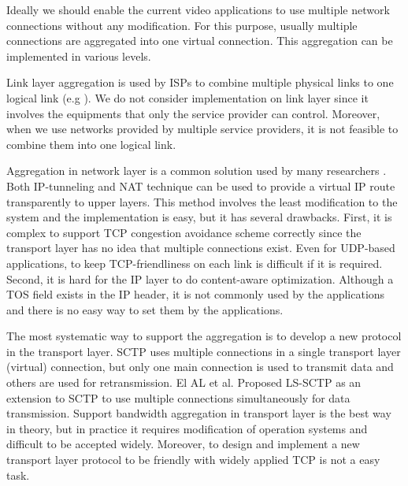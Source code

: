 \documentclass{article}
\begin{document}
	Ideally we should enable the current video applications to use 
	multiple network connections without any modification. 
	For this purpose, usually multiple connections are aggregated 
	into one virtual connection. 
	This aggregation can be implemented in various levels. 
    
	Link layer aggregation is used by 
	ISPs to combine multiple physical links to one logical link 
	(e.g \cite{snoeren:adaptive}). 
	We do not consider implementation on link layer since it involves the
	equipments that only the service provider can control. 
    Moreover, when we use networks provided by multiple service providers, 
    it is not feasible to combine them into one logical link.

    Aggregation in network layer is a common solution used 
    by many researchers \cite{phatak:novel, chebrolu:bandwidth}. Both IP-tunneling and NAT technique
    can be used to provide a virtual IP route transparently to upper layers.
    This method involves the least modification to the system
    and the implementation is easy, but it has several drawbacks.
    First, it is complex to support TCP congestion avoidance scheme
    correctly since the transport layer has no idea that multiple connections exist.
    Even for UDP-based applications, to keep TCP-friendliness on
    each link is difficult if it is required.
    Second, it is hard for the IP layer to do content-aware 
    optimization. Although a TOS field exists in the IP header,
    it is not commonly used by the applications and there is no easy way
    to set them by the applications.


    The most systematic way to support the aggregation is 
    to develop a new protocol in the transport layer. 
	SCTP \cite{rfc4960} uses multiple connections in a 
	single transport layer (virtual) connection, 
	but only one main connection is used to transmit data and others are 
	used for retransmission. 
	El AL et al. Proposed LS-SCTP \cite{elal:transport} as an extension
	to SCTP to use multiple connections simultaneously for data transmission.  
    Support bandwidth aggregation in transport layer is the best 
    way in theory, but in practice it requires modification
    of operation systems and difficult to be accepted widely.
    Moreover, to design and implement a new transport layer protocol
    to be friendly with widely applied TCP is not a easy task.
\end{document}
